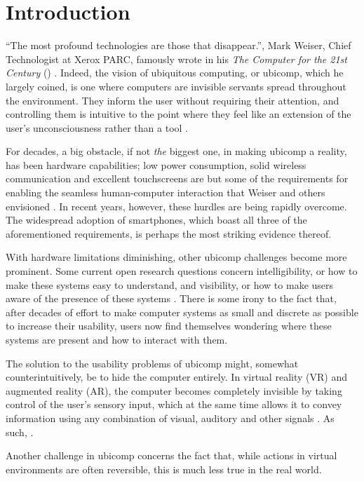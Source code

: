 \documentclass[a4paper,fancychapters]{article}
\begin{document}
	
\section{Introduction} \label{sec:introduction}
``The most profound technologies are those that disappear.'', Mark Weiser, Chief Technologist at Xerox PARC, famously wrote in his \textit{The Computer for the 21st Century} (\citeyear{weiser1991computer}) \cite{weiser1991computer}. Indeed, the vision of ubiquitous computing, or ubicomp, which he largely coined, is one where computers are invisible servants spread throughout the environment. They inform the user without requiring their attention, and controlling them is intuitive to the point where they feel like an extension of the user's unconsciousness rather than a tool \cite{weiser1997coming}. %

For decades, a big obstacle, if not \textit{the} biggest one, in making ubicomp a reality, has been hardware capabilities; low power consumption, solid wireless communication and excellent touchscreens are but some of the requirements for enabling the seamless human-computer interaction that Weiser and others envisioned \cite{weiser1993some}. In recent years, however, these hurdles are being rapidly overcome. The widespread adoption of smartphones, which boast all three of the aforementioned requirements, is perhaps the most striking evidence thereof.

With hardware limitations diminishing, other ubicomp challenges become more prominent. Some current open research questions concern intelligibility, or how to make these systems easy to understand, and visibility, or how to make users aware of the presence of these systems \cite{vermeulen2009bet,vermeulen2013intelligibility}. There is some irony to the fact that, after decades of effort to make computer systems as small and discrete as possible to increase their usability, users now find themselves wondering where these systems are present and how to interact with them.

The solution to the usability problems of ubicomp might, somewhat counterintuitively, be to hide the computer entirely. In virtual reality (VR) and augmented reality (AR), the computer becomes completely invisible by taking control of the user's sensory input, which at the same time allows it to convey information using any combination of visual, auditory and other signals \cite{rheingold1991virtual}. As such, \cite{weiser1993some}.

Another challenge in ubicomp concerns the fact that, while actions in virtual environments are often reversible, this is much less true in the real world.
\end{document}
